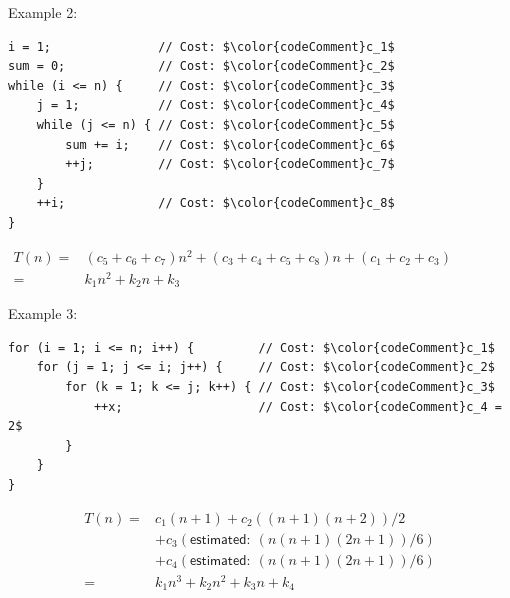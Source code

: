 \documentclass[14pt,aspectratio=1610, hyperref={pdfpagelayout=SinglePage}]{beamer}
\begin{document}
\begin{frame}[fragile]{Example 2: }
\begin{lstlisting}[mathescape, basicstyle=\small\ttfamily]
i = 1;               // Cost: $\color{codeComment}c_1$
sum = 0;             // Cost: $\color{codeComment}c_2$
while (i <= n) {     // Cost: $\color{codeComment}c_3$
    j = 1;           // Cost: $\color{codeComment}c_4$
    while (j <= n) { // Cost: $\color{codeComment}c_5$
        sum += i;    // Cost: $\color{codeComment}c_6$
        ++j;         // Cost: $\color{codeComment}c_7$
    }
    ++i;             // Cost: $\color{codeComment}c_8$
}
\end{lstlisting}%
\pause%
{\centering
$ \displaystyle
\begin{aligned}%
    T(n)  =& (c_5+c_6+c_7)n^2 + (c_3+c_4+c_5+c_8)n + (c_1+c_2+c_3) \\
            =& k_1 n^2 + k_2 n + k_3
\end{aligned}
$

\pause%
\par} %
\end{frame}

\begin{frame}[fragile]{Example 3: }
\begin{lstlisting}[mathescape, basicstyle=\small\ttfamily]
for (i = 1; i <= n; i++) {         // Cost: $\color{codeComment}c_1$
    for (j = 1; j <= i; j++) {     // Cost: $\color{codeComment}c_2$
        for (k = 1; k <= j; k++) { // Cost: $\color{codeComment}c_3$
            ++x;                   // Cost: $\color{codeComment}c_4 = 2$
        }
    }
}
\end{lstlisting}%
\pause%
\vspace{-1em}\begin{align*}%
T(n)  =&  c_1 (n+1) + c_2 ((n+1) (n+2)) / 2 \\
       & + c_3 (\mathsf{estimated:}~(n   (n + 1)   (2n + 1)) / 6)\\
       & + c_4 (\mathsf{estimated:}~(n   (n + 1)   (2n + 1)) / 6) \\
      =& k_1 n^3 + k_2 n^2 + k_3 n + k_4
\end{align*}%
\end{frame}
\end{document}
